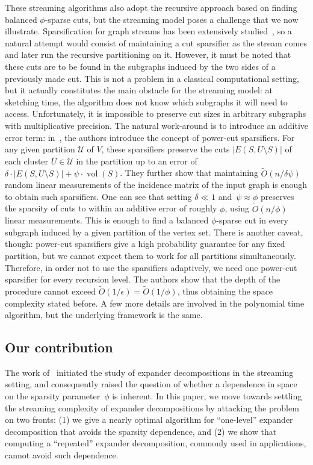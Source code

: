 \documentclass[epsfig,letter,11pt]{article}
\numberwithin{equation}{section}
\DeclareMathOperator{\vol}{vol}
\newcommand{\otil}{\tilde{O}}
\renewcommand{\tilde}{\widetilde}
\begin{document}
These streaming algorithms also adopt the recursive approach based on finding balanced $\phi$-sparse cuts, but the streaming model poses a challenge that we now illustrate. Sparsification for graph streams has been extensively studied~\cite{ahnguha,linmeas,sparsdynamicstreams,focsspars,spectralspars}, so a natural attempt would consist of maintaining a cut sparsifier as the stream comes and later run the recursive partitioning on it. However, it must be noted that these cuts are to be found in the subgraphs induced by the two sides of a previously made cut. This is not a problem in a classical computational setting, but it actually constitutes the main obstacle for the streaming model: at sketching time, the algorithm does not know which subgraphs it will need to access. Unfortunately, it is impossible to preserve cut sizes in arbitrary subgraphs with multiplicative precision. The natural work-around is to introduce an additive error term: in~\cite{streamexpdec}, the authors introduce the concept of {power-cut} sparsifiers. For any given partition $\mathcal{U}$ of $V$, these sparsifiers preserve the cuts $|E(S,U\setminus S)|$ of each cluster $U \in \mathcal{U}$ in the partition up to an error of $\delta \cdot |E(S,U\setminus S)| + \psi \cdot \vol(S)$. They further show that maintaining $\otil(n / \delta \psi)$ random linear measurements of the incidence matrix of the input graph is enough to obtain such sparsifiers. One can see that setting $\delta \ll 1$ and~$\psi \approx \phi$ preserves the sparsity of cuts to within an additive error of roughly $\phi$, using $\otil(n/\phi)$ linear measurements. This is enough to find a balanced $\phi$-sparse cut in every subgraph induced by a given partition of the vertex set. There is another caveat, though: power-cut sparsifiers give a high probability guarantee for any fixed partition, but we cannot expect them to work for all partitions simultaneously. Therefore, in order not to use the sparsifiers adaptively, we need one power-cut sparsifier for every recursion level. The authors show that the depth of the procedure cannot exceed $\otil(1/\epsilon) = \otil(1/\phi)$, thus obtaining the space complexity stated before. A few more details are involved in the polynomial time algorithm, but the underlying framework is the same.

\subsection{Our contribution}
The work of~\cite{streamexpdec} initiated the study of expander decompositions in the streaming setting, and consequently raised the question of whether a dependence in space on the sparsity parameter~$\phi$ is inherent. In this paper, we move towards settling the streaming complexity of expander decompositions by attacking the problem on two fronts: (1) we give a nearly optimal algorithm for ``one-level'' expander decomposition that avoids the sparsity dependence, and (2) we show that computing a ``repeated'' expander decomposition, commonly used in applications, cannot avoid such dependence.
\end{document}
